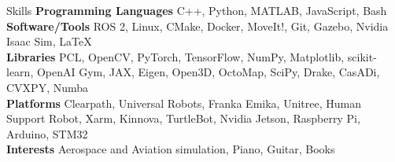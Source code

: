 \documentclass{resume}
\begin{document}
\begin{rSection}{Skills}
{\bf Programming Languages} \hspace{1em} C++, Python, MATLAB, JavaScript, Bash\\ 
{\bf Software/Tools} \hspace{1em} ROS 2, Linux, CMake, Docker, MoveIt!, Git, Gazebo, Nvidia Isaac Sim, \LaTeX \\
{\bf Libraries } \hspace{1em} PCL, OpenCV, PyTorch, TensorFlow, NumPy, Matplotlib, scikit-learn,  OpenAI Gym, JAX, Eigen, \newline\hspace*{5.3em}Open3D, OctoMap, SciPy, Drake, CasADi, CVXPY, Numba \\ 
{\bf Platforms } \hspace{1em} Clearpath, Universal Robots, Franka Emika, Unitree, Human Support Robot, Xarm, Kinnova,\newline\hspace*{5.6em} TurtleBot, Nvidia Jetson, Raspberry Pi, Arduino, STM32 \\ 
{\bf Interests } \hspace{1em}Aerospace and Aviation simulation, Piano, Guitar, Books
\end{rSection}
\newpage
\end{document}
